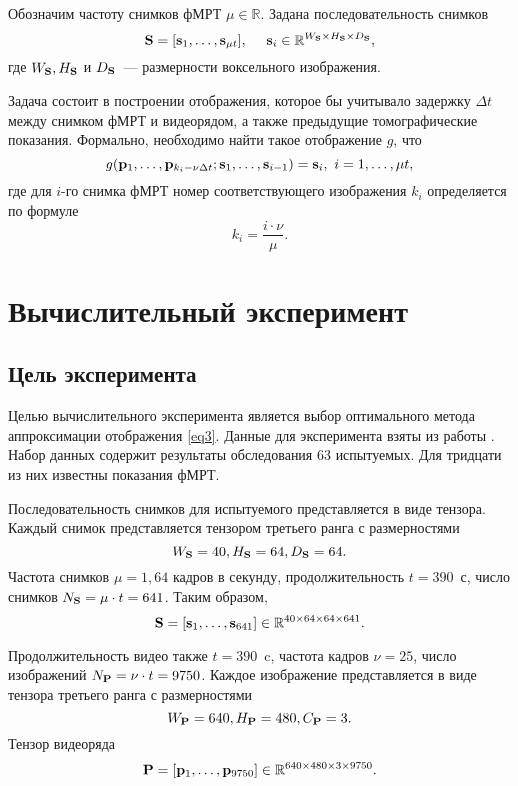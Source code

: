 \documentclass[a4paper, 12pt]{article}
\begin{document}
	Обозначим частоту снимков фМРТ $\mu \in \mathbb{R}$. Задана последовательность снимков 
	\begin{equation}
		\label{eq2}
		\mathbf{S} = [\mathbf{s}_1, \ldots, \mathbf{s}_{\mu t}], \quad\
		\mathbf{s}_i \in \mathbb{R}^{W_{\mathbf{S}} \times H_{\mathbf{S}} \times D_{\mathbf{S}}},
	\end{equation}
	где $W_{\mathbf{S}}, H_{\mathbf{S}}$ и $D_{\mathbf{S}}$~--- размерности воксельного изображения. 

	Задача состоит в построении отображения, которое бы учитывало задержку $\Delta t$ между
	снимком фМРТ и видеорядом, а также предыдущие томографические показания. Формально, необходимо
	найти такое отображение $g$, что
	\begin{equation}
		\label{eq3}
		g(\mathbf{p}_1, \ldots, \mathbf{p}_{k_i - \nu \Delta t}; \mathbf{s}_1, \ldots, \mathbf{s}_{i-1}) = \mathbf{s}_i,
		\ i = 1, \ldots, \mu t,
	\end{equation}
	где для $i$-го снимка фМРТ номер соответствующего изображения $k_i$ определяется по формуле
	\begin{equation}
		\label{eq4}
		k_i = \dfrac{i \cdot \nu}{\mu}.
	\end{equation}

\section{Вычислительный эксперимент}

\subsection{Цель эксперимента}

	Целью вычислительного эксперимента является выбор оптимального метода аппроксимации
	отображения \eqref{eq3}. Данные для эксперимента взяты из работы \citep{Berezutskaya2022}. 
	Набор данных содержит результаты обследования 63 испытуемых. Для тридцати из них известны
	показания фМРТ.

	Последовательность снимков для испытуемого представляется в виде тензора.
	Каждый снимок представляется тензором третьего ранга с размерностями 
	\[ W_{\mathbf{S}} = 40, H_{\mathbf{S}} = 64, D_{\mathbf{S}} = 64. \]
	Частота снимков $\mu = 1,64$ кадров в секунду, продолжительность $t = 390$~с, 
	число снимков $N_{\mathbf{S}} = \mu \cdot t = 641$. Таким образом, 
	\[ \mathbf{S} = [\mathbf{s}_1, \ldots, \mathbf{s}_{641}] \in \mathbb{R}^{40 \times 64 \times 64 \times 641}. \]

	Продолжительность видео также $t = 390$~c, частота кадров $\nu = 25$, число изображений
	$N_{\mathbf{P}} = \nu \cdot t = 9750$.
	Каждое изображение представляется в виде тензора третьего ранга с размерностями
	\[ W_{\mathbf{P}} = 640, H_{\mathbf{P}} = 480, C_{\mathbf{P}} = 3. \]
	Тензор видеоряда
	\[ \mathbf{P} = [\mathbf{p}_1, \ldots, \mathbf{p}_{9750}] \in \mathbb{R}^{640 \times 480 \times 3 \times 9750}. \]
\end{document}
